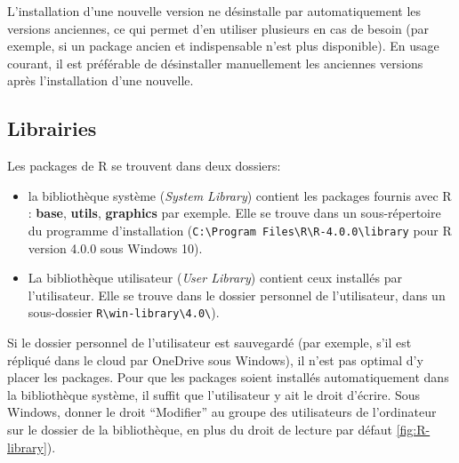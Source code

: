 \documentclass[
  12pt,
  french,
  a4paper,
  extrafontsizes,onecolumn,openright
  ]{memoir}
\providecommand{\tightlist}{%
  \setlength{\itemsep}{0pt}\setlength{\parskip}{0pt}}
\begin{document}
L'installation d'une nouvelle version ne désinstalle par automatiquement les versions anciennes, ce qui permet d'en utiliser plusieurs en cas de besoin (par exemple, si un package ancien et indispensable n'est plus disponible).
En usage courant, il est préférable de désinstaller manuellement les anciennes versions après l'installation d'une nouvelle.

\hypertarget{sec:librairies}{%
\subsection{Librairies}\label{sec:librairies}}

Les packages de R se trouvent dans deux dossiers:

\begin{itemize}
\tightlist
\item
  la bibliothèque système (\emph{System Library}) contient les packages fournis avec R : \textbf{base}, \textbf{utils}, \textbf{graphics} par exemple.
  Elle se trouve dans un sous-répertoire du programme d'installation (\texttt{C:\textbackslash{}Program\ Files\textbackslash{}R\textbackslash{}R-4.0.0\textbackslash{}library} pour R version 4.0.0 sous Windows 10).
\item
  La bibliothèque utilisateur (\emph{User Library}) contient ceux installés par l'utilisateur.
  Elle se trouve dans le dossier personnel de l'utilisateur, dans un sous-dossier \texttt{R\textbackslash{}win-library\textbackslash{}4.0\textbackslash{}}).
\end{itemize}

Si le dossier personnel de l'utilisateur est sauvegardé (par exemple, s'il est répliqué dans le cloud par OneDrive sous Windows), il n'est pas optimal d'y placer les packages.
Pour que les packages soient installés automatiquement dans la bibliothèque système, il suffit que l'utilisateur y ait le droit d'écrire.
Sous Windows, donner le droit \enquote{Modifier} au groupe des utilisateurs de l'ordinateur sur le dossier de la bibliothèque, en plus du droit de lecture par défaut \ref{fig:R-library}).



\scriptsize
\end{document}
